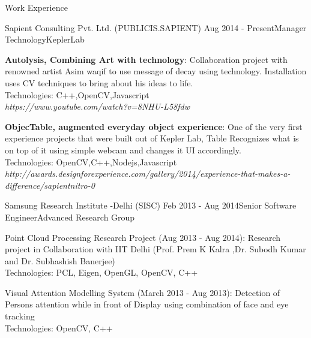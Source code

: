 \documentclass{resume} %
\begin{document}
\begin{rSection}{Work Experience}
\begin{rSubsection}{Sapient Consulting Pvt. Ltd. (PUBLICIS.SAPIENT) }{Aug 2014 - Present}{Manager Technology}{KeplerLab}
\item \textbf{Autolysis, Combining Art with technology}:
Collaboration project with renowned artist Asim waqif to use message of decay
using technology. Installation uses CV techniques to bring about his ideas to life.\\
Technologies: C++,OpenCV,Javascript\\
\textit{https://www.youtube.com/watch?v=8NHU-L58fdw}



\item \textbf{ObjecTable, augmented everyday object experience}:
One of the very first experience projects that were built out of Kepler Lab,
Table Recognizes what is on top of it using simple webcam and changes it UI accordingly.\\
Technologies: OpenCV,C++,Nodejs,Javascript\\ 
\textit{http://awards.designforexperience.com/gallery/2014/experience-that-makes-a-difference/sapientnitro-0}


\end{rSubsection}

\begin{rSubsection}{Samsung Research Institute -Delhi (SISC) }{Feb 2013 - Aug 2014}{Senior Software Engineer}{Advanced Research Group}
\item Point Cloud Processing Research Project (Aug 2013 - Aug 2014): 
Research project in Collaboration with IIT Delhi (Prof. Prem K Kalra ,Dr. Subodh Kumar and Dr. Subhashish Banerjee) \\
Technologies: PCL, Eigen, OpenGL, OpenCV, C++
\item Visual Attention Modelling System (March 2013 - Aug 2013): 
Detection of Persons attention while in front of Display using combination of face and eye tracking\\
Technologies: OpenCV, C++

\end{rSubsection}



\end{rSection}
\end{document}
